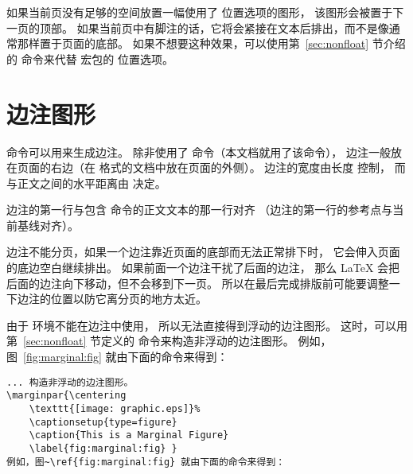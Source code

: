 如果当前页没有足够的空间放置一幅使用了 \opt{[H]} 位置选项的图形，
该图形会被置于下一页的顶部。
如果当前页中有脚注的话，它将会紧接在文本后排出，而不是像通常那样置于页面的底部。
如果不想要这种效果，可以使用第~\ref{sec:nonfloat} 节介绍的  命令来代替  宏包的 \opt{[H]} 位置选项。


\section{边注图形}\label{sec:marginfigure}

 命令可以用来生成边注。
除非使用了  命令（本文档就用了该命令），
边注一般放在页面的右边（在  格式的文档中放在页面的外侧）。
边注的宽度由长度  控制，
而与正文之间的水平距离由  决定。

边注的第一行与包含  命令的正文文本的那一行对齐
（边注的第一行的参考点与当前基线对齐）。

边注不能分页，如果一个边注靠近页面的底部而无法正常排下时，
它会伸入页面的底边空白继续排出。
如果前面一个边注干扰了后面的边注，
那么 \LaTeX{} 会把后面的边注向下移动，但不会移到下一页。
所以在最后完成排版前可能要调整一下边注的位置以防它离分页的地方太近。

由于  环境不能在边注中使用，
所以无法直接得到浮动的边注图形。
这时，可以用第~\ref{sec:nonfloat} 节定义的  命令来构造非浮动的边注图形。
例如，图~\ref{fig:marginal:fig} 就由下面的命令来得到：
\begin{lstlisting}
... 构造非浮动的边注图形。
\marginpar{\centering 
	\texttt{[image: graphic.eps]}% 
	\captionsetup{type=figure}
	\caption{This is a Marginal Figure} 
	\label{fig:marginal:fig} }
例如，图~\ref{fig:marginal:fig} 就由下面的命令来得到：
\end{lstlisting}

